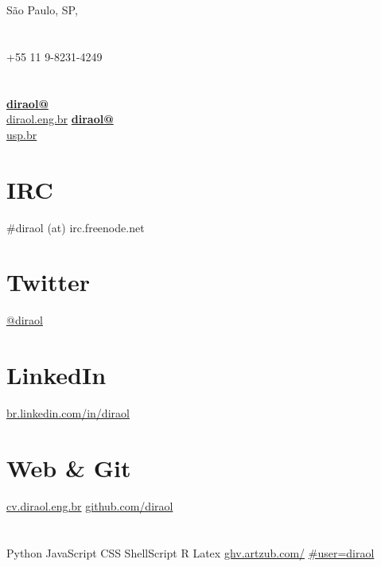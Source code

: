 \documentclass[]{friggeri-cv}
\begin{document}
\thispagestyle{empty}
%
%


\begin{aside}
  \section{}
    São Paulo, SP, 
    ~
  \section{}
    +55 11 9-8231-4249
    ~
  \section{}
    \href{mailto:diraol@diraol.eng.br}{\textbf{diraol@}\\diraol.eng.br}
    \href{mailto:diraol@usp.br}{\textbf{diraol@}\\usp.br}
    ~
  \section{IRC}
    \#diraol (at) irc.freenode.net
    ~
  \section{Twitter}
    \href{http://twitter.com/diraol}{@diraol}
    ~
  \section{LinkedIn}
    \href{http://br.linkedin.com/in/diraol}{br.linkedin.com/in/diraol}
    ~
  \section{Web \& Git}
    \href{http://cv.diraol.eng.br}{cv.diraol.eng.br}
    \href{https://github.com/diraol}{github.com/diraol}
    ~
  \section{}
    Python
    JavaScript
    CSS
    ShellScript
    R
    Latex
    \href{http://ghv.artzub.com/\#user=diraol}{ghv.artzub.com/}
    \href{http://ghv.artzub.com/\#user=diraol}{\#user=diraol}
    ~

\end{aside}
\end{document}
